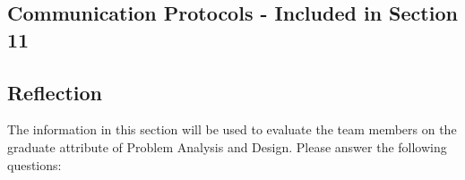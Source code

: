 \documentclass[12pt, titlepage]{article}
\begin{document}
 \newpage
    
 \newpage
 
\subsection{Communication Protocols - Included in Section 11}



\subsection{Reflection}

The information in this section will be used to evaluate the team members on the
graduate attribute of Problem Analysis and Design.  Please answer the following questions:
\end{document}
